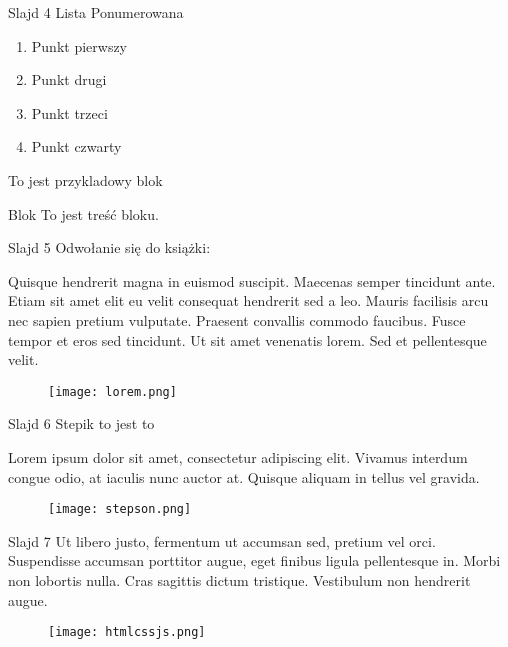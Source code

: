 \documentclass{beamer}
\begin{document}
\begin{frame}{Slajd 4}
Lista Ponumerowana
\begin{enumerate}
  \item Punkt pierwszy
  \item Punkt drugi
  \item Punkt trzeci
  \item Punkt czwarty
  \label{fig:tabela}
\end{enumerate}
\vspace{10pt}
To jest przykladowy blok

\begin{block}{Blok}
  To jest treść bloku.
\end{block}

\end{frame}


\begin{frame}{Slajd 5}
Odwołanie się do książki: \cite{Autor2}

Quisque hendrerit magna in euismod suscipit. Maecenas semper tincidunt ante. Etiam sit amet elit eu velit consequat hendrerit sed a leo. Mauris facilisis arcu nec sapien pretium vulputate. Praesent convallis commodo faucibus. Fusce tempor et eros sed tincidunt. Ut sit amet venenatis lorem. Sed et pellentesque velit. 
\vspace{5pt}
\begin{figure}
    \centering
    \texttt{[image: lorem.png]}
    \label{fig:lorem}
\end{figure}

\end{frame}

\begin{frame}{Slajd 6}
Stepik to jest to

Lorem ipsum dolor sit amet, consectetur adipiscing elit. Vivamus interdum congue odio, at iaculis nunc auctor at. Quisque aliquam in tellus vel gravida.

\begin{figure}
    \centering
    \texttt{[image: stepson.png]}
    \label{fig:stepik}
\end{figure}
\end{frame}

\begin{frame}{Slajd 7}
Ut libero justo, fermentum ut accumsan sed, pretium vel orci. Suspendisse accumsan porttitor augue, eget finibus ligula pellentesque in. Morbi non lobortis nulla. Cras sagittis dictum tristique. Vestibulum non hendrerit augue. 

\begin{figure}
    \centering
    \texttt{[image: htmlcssjs.png]}

    \label{fig:html}
\end{figure}
\end{frame}
\end{document}
